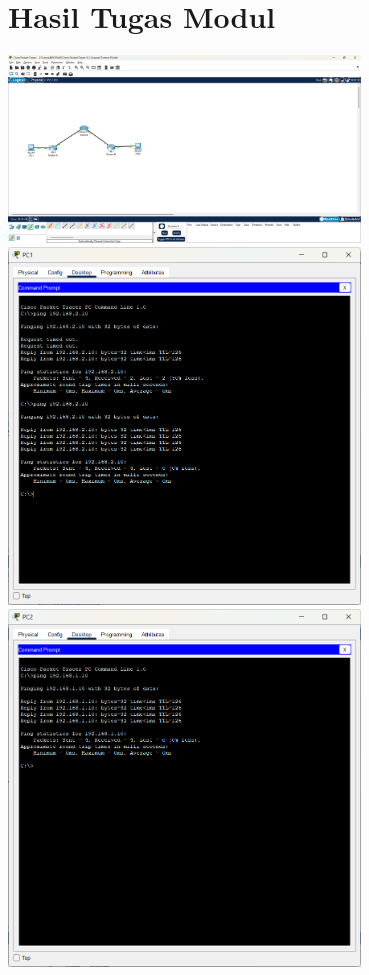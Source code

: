 \section{Hasil Tugas Modul}
\includegraphics[width=0.7\textwidth]{P5/img/topologi.png}
\includegraphics[width=0.7\textwidth]{P5/img/ping1.png}
\includegraphics[width=0.7\textwidth]{P5/img/ping2.png}

